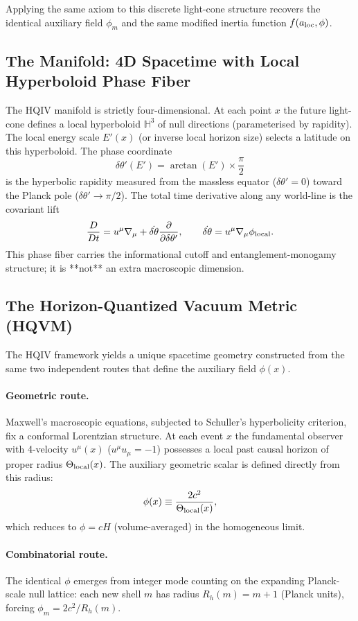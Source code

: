 \documentclass[12pt,a4paper]{article}
\begin{document}
Applying the same axiom to this discrete light-cone structure recovers the identical auxiliary field $\phi_m$ and the same modified inertia function $f(a_{\rm loc}, \phi)$.


\subsection{The Manifold: 4D Spacetime with Local Hyperboloid Phase Fiber}

The HQIV manifold is strictly four-dimensional. At each point $x$ the future light-cone defines a local hyperboloid $\mathbb{H}^3$ of null directions (parameterised by rapidity). The local energy scale $E'(x)$ (or inverse local horizon size) selects a latitude on this hyperboloid. The phase coordinate
\[
\delta\theta'(E') = \arctan(E') \times \frac{\pi}{2}
\]
is the hyperbolic rapidity measured from the massless equator ($\delta\theta'=0$) toward the Planck pole ($\delta\theta'\to\pi/2$). The total time derivative along any world-line is the covariant lift
\[
\frac{D}{Dt} = u^\mu \nabla_\mu + \dot{\delta\theta} \frac{\partial}{\partial \delta\theta'}, \qquad
\dot{\delta\theta} = u^\mu \nabla_\mu \phi_{\rm local}.
\]
This phase fiber carries the informational cutoff and entanglement-monogamy structure; it is **not** an extra macroscopic dimension.

\subsection{The Horizon-Quantized Vacuum Metric (HQVM)}
\label{sec:hqvm}

The HQIV framework yields a unique spacetime geometry constructed from the same two independent routes that define the auxiliary field $\phi(x)$.

\paragraph{Geometric route.}  
Maxwell's macroscopic equations, subjected to Schuller's hyperbolicity criterion, fix a conformal Lorentzian structure. At each event $x$ the fundamental observer with 4-velocity $u^\mu(x)$ ($u^\mu u_\mu=-1$) possesses a local past causal horizon of proper radius $\Theta_{\rm local}(x)$. The auxiliary geometric scalar is defined directly from this radius:
\[
\phi(x) \equiv \frac{2c^2}{\Theta_{\rm local}(x)},
\]
which reduces to $\phi=cH$ (volume-averaged) in the homogeneous limit.

\paragraph{Combinatorial route.}  
The identical $\phi$ emerges from integer mode counting on the expanding Planck-scale null lattice: each new shell $m$ has radius $R_h(m)=m+1$ (Planck units), forcing $\phi_m=2c^2/R_h(m)$.
\end{document}
